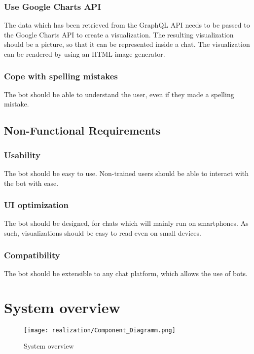 \subsubsection{Use Google Charts API} The data which has been retrieved from the GraphQL API needs to be passed to the Google Charts API to create a visualization. The resulting visualization should be a picture, so that it can be represented inside a chat. The visualization can be rendered by using an HTML image generator.

\subsubsection{Cope with spelling mistakes} The bot should be able to understand the user, even if they made a spelling mistake.

\subsection{Non-Functional Requirements}

\subsubsection{Usability} The bot should be easy to use. Non-trained users should be able to interact with the bot with ease.

\subsubsection{UI optimization} The bot should be designed, for chats which will mainly run on smartphones. As such, visualizations should be easy to read even on small devices.

\subsubsection{Compatibility} The bot should be extensible to any chat platform, which allows the use of bots.

\section{System overview}


\begin{figure}[h]
    \centering
    \texttt{[image: realization/Component\_Diagramm.png]}
    \caption{System overview}
    \label{fig:sytsemOverview}
\end{figure}

